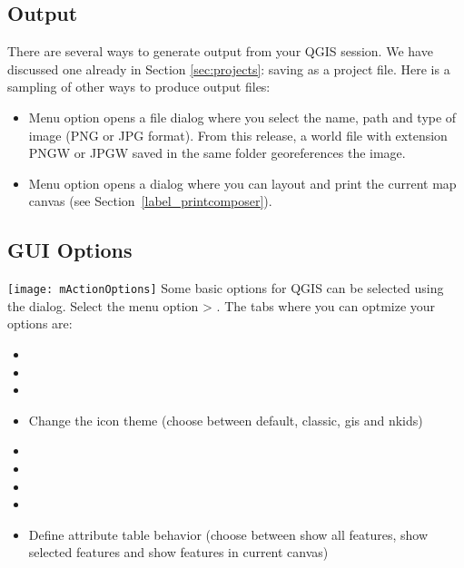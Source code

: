 \subsection{Output}\label{sec:output}
There are several ways to generate output from your QGIS session.
We have discussed one already in Section \ref{sec:projects}: saving as a project file. 
Here is a sampling of other ways to produce output files:
\begin{itemize}
\item Menu option  opens a
file dialog where you select the name, path and type of image (PNG or JPG format). From this
release, a world file with extension PNGW or JPGW saved in the same folder georeferences the image.
\item Menu option  opens a dialog 
where you can layout and print the current map canvas (see Section~\ref{label_printcomposer}).
\end{itemize}


\subsection{GUI Options}
\label{subsec:gui_options}
\texttt{[image: mActionOptions]} 
Some basic options for QGIS
can be selected using the  dialog. Select the 
menu option  >
 . The tabs where you can 
optmize your options are:


\begin{itemize}
\item {}
\item {}
\item {}
\item Change the icon theme (choose between default, classic, gis and nkids)
\item {}
\item {}
\item {}
\item {}
\item Define attribute table behavior (choose between show all features, show 
selected features and show features in current canvas)
\end{itemize}

